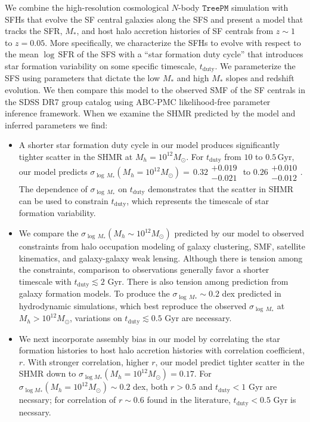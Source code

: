 \documentclass[12pt, letterpaper, preprint, tighten]{aastex62}
\newcommand{\bitem}{\begin{itemize}}
\newcommand{\eitem}{\end{itemize}}
\begin{document}
We combine the high-resolution cosmological $N$-body $\mathtt{TreePM}$ simulation 
with SFHs that evolve the SF central galaxies along the SFS and present a model 
that tracks the SFR, $M_*$, and host halo accretion histories of SF centrals from $z \sim 1$
to $z=0.05$. More specifically, we characterize the SFHs to evolve with respect to 
the mean $\log\,\mathrm{SFR}$ of the SFS with a ``star formation duty cycle'' that 
introduces star formation variability on some specific timescale, $t_\mathrm{duty}$. We parameterize 
the SFS using parameters that dictate the low $M_*$ and high $M_*$ slopes and redshift 
evolution. We then compare this model to the observed SMF of the SF centrals in the 
SDSS DR7 group catalog using ABC-PMC likelihood-free parameter inference framework. 
When we examine the SHMR predicted by the model and inferred parameters we find: 
\bitem
\item A shorter star formation duty cycle in our model produces significantly 
    tighter scatter in the SHMR at $M_h = 10^{12} M_\odot$. For 
    $t_\mathrm{duty}$ from $10$ to $0.5\,\mathrm{Gyr}$, our model predicts 
    $\sigma_{\log\,M_*}(M_h=10^{12}M_\odot){=}\,0.32\substack{+0.019\\ -0.021}$ to $0.26\substack{+0.010\\-0.012}$.
    The dependence of $\sigma_{\log\,M_*}$ on $t_\mathrm{duty}$ demonstrates that 
    the scatter in SHMR can be used to constrain $t_\mathrm{duty}$, which represents the timescale 
    of star formation variability. 

\item We compare the $\sigma_{\log\,M_*}(M_h\sim10^{12}M_\odot)$ predicted by our 
    model to observed constraints from halo occupation modeling of galaxy clustering, SMF, 
    satellite kinematics, and galaxy-galaxy weak lensing. Although 
    there is tension among the constraints, comparison to observations generally favor a shorter 
    timescale with $t_\mathrm{duty} \lesssim 2$ Gyr. There is also tension among 
    prediction from galaxy formation models. To produce the $\sigma_{\log\,M_*}\sim 0.2$ dex
    predicted in hydrodynamic simulations, which best reproduce the observed 
    $\sigma_{\log\,M_*}$ at $M_h>10^{12}M_\odot$, variations on $t_\mathrm{duty} \lesssim 0.5$ Gyr 
    are necessary.

\item We next incorporate assembly bias in our model by correlating the star 
    formation histories to host halo accretion histories with correlation 
    coefficient, $r$. With stronger correlation, higher $r$, our model predict 
    tighter scatter in the SHMR down to $\sigma_{\log M_*}(M_h=10^{12}M_\odot){=}0.17$. 
    For $\sigma_{\log M_*}(M_h=10^{12}M_\odot)\sim 0.2$ dex, both $r > 0.5$ and 
    $t_\mathrm{duty} < 1$ Gyr are necssary; for correlation of $r \sim 0.6$ found
    in the literature, $t_\mathrm{duty} < 0.5$ Gyr is necssary.
\eitem 
\end{document}
